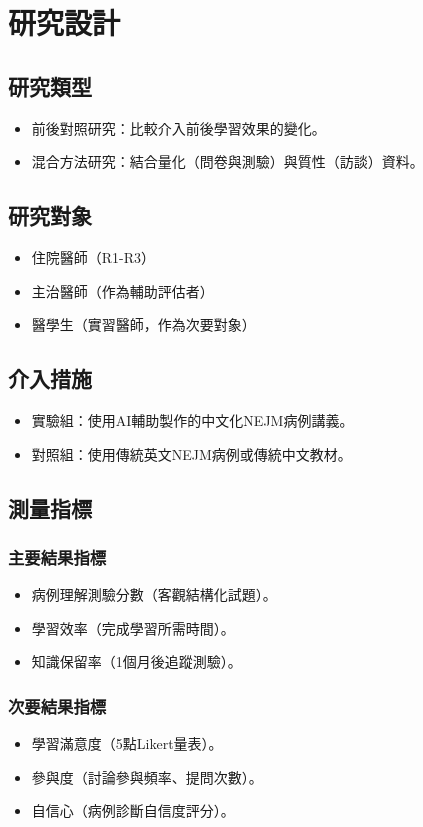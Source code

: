 \documentclass[12pt]{article}
\begin{document}
\section{研究設計}
\subsection{研究類型}
\begin{itemize}
    \item 前後對照研究：比較介入前後學習效果的變化。
    \item 混合方法研究：結合量化（問卷與測驗）與質性（訪談）資料。
\end{itemize}

\subsection{研究對象}
\begin{itemize}
    \item 住院醫師（R1-R3）
    \item 主治醫師（作為輔助評估者）
    \item 醫學生（實習醫師，作為次要對象）
\end{itemize}

\subsection{介入措施}
\begin{itemize}
    \item 實驗組：使用AI輔助製作的中文化NEJM病例講義。
    \item 對照組：使用傳統英文NEJM病例或傳統中文教材。
\end{itemize}

\subsection{測量指標}
\subsubsection{主要結果指標}
\begin{itemize}
    \item 病例理解測驗分數（客觀結構化試題）。
    \item 學習效率（完成學習所需時間）。
    \item 知識保留率（1個月後追蹤測驗）。
\end{itemize}

\subsubsection{次要結果指標}
\begin{itemize}
    \item 學習滿意度（5點Likert量表）。
    \item 參與度（討論參與頻率、提問次數）。
    \item 自信心（病例診斷自信度評分）。
\end{itemize}
\end{document}
